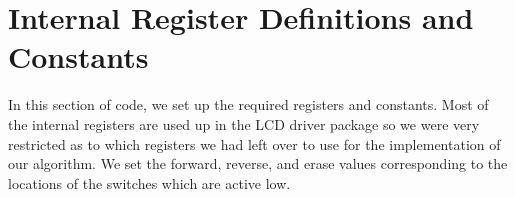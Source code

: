 \documentclass[12pt, letterpaper]{article}
\begin{document}

\section{Internal Register Definitions and Constants}

In this section of code, we set up the required registers and constants. Most of the internal registers are used up in the LCD driver package so we were very restricted as to which registers we had left over to use for the implementation of our algorithm. We set the forward, reverse, and erase values corresponding to the locations of the switches which are active low.
\end{document}
